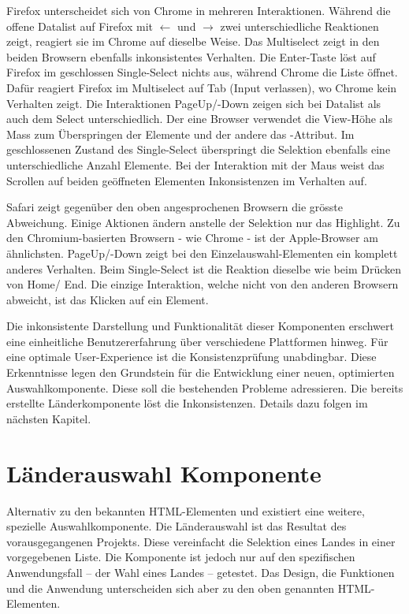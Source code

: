 Firefox unterscheidet sich von Chrome in mehreren Interaktionen. 
Während die offene Datalist auf Firefox mit $\leftarrow$ und $\rightarrow$ zwei unterschiedliche Reaktionen zeigt, reagiert sie im Chrome auf dieselbe Weise. 
Das Multiselect zeigt in den beiden Browsern ebenfalls inkonsistentes Verhalten. 
Die Enter-Taste löst auf Firefox im geschlossen Single-Select nichts aus, während Chrome die Liste öffnet. 
Dafür reagiert Firefox im Multiselect auf Tab (Input verlassen), wo Chrome kein Verhalten zeigt. 
Die Interaktionen PageUp/-Down zeigen sich bei Datalist als auch dem Select unterschiedlich. 
Der eine Browser verwendet die View-Höhe als Mass zum Überspringen der Elemente und der andere das -Attribut. 
Im geschlossenen Zustand des Single-Select überspringt die Selektion ebenfalls eine unterschiedliche Anzahl Elemente. 
Bei der Interaktion mit der Maus weist das Scrollen auf beiden geöffneten Elementen Inkonsistenzen im Verhalten auf. 

Safari zeigt gegenüber den oben angesprochenen Browsern die grösste Abweichung. 
Einige Aktionen ändern anstelle der Selektion nur das Highlight. 
Zu den Chromium-basierten Browsern - wie Chrome - ist der Apple-Browser am ähnlichsten. 
PageUp/-Down zeigt bei den Einzelauswahl-Elementen ein komplett anderes Verhalten. 
Beim Single-Select ist die Reaktion dieselbe wie beim Drücken von Home/ End. 
Die einzige Interaktion, welche nicht von den anderen Browsern abweicht, ist das Klicken auf ein Element. 

Die inkonsistente Darstellung und Funktionalität dieser Komponenten erschwert eine einheitliche Benutzererfahrung über verschiedene Plattformen hinweg. 
Für eine optimale User-Experience ist die Konsistenzprüfung unabdingbar. 
Diese Erkenntnisse legen den Grundstein für die Entwicklung einer neuen, optimierten Auswahlkomponente. 
Diese soll die bestehenden Probleme adressieren. 
Die bereits erstellte Länderkomponente löst die Inkonsistenzen. 
Details dazu folgen im nächsten Kapitel. 


\section{Länderauswahl Komponente}
\label{sec:countryChoice}

Alternativ zu den bekannten HTML-Elementen  und  existiert eine weitere, spezielle Auswahlkomponente. 
Die Länderauswahl\citemarktext{
    [\cite{ip5}]
} ist das Resultat des vorausgegangenen Projekts. 
Diese vereinfacht die Selektion eines Landes in einer vorgegebenen Liste. 
Die Komponente ist jedoch nur auf den spezifischen Anwendungsfall – der Wahl eines Landes – getestet. 
Das Design, die Funktionen und die Anwendung unterscheiden sich aber zu den oben genannten HTML-Elementen.


